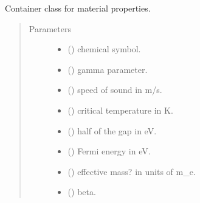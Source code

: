 \documentclass[letterpaper,10pt,english]{sphinxmanual}
\begin{document}
\begin{fulllineitems}
\label{\detokenize{code_structure:scdc.material.Material}}
Container class for material properties.
\begin{quote}\begin{description}
\item[{Parameters}] \leavevmode\begin{itemize}
\item {} 
 () \textendash{} chemical symbol.

\item {} 
 () \textendash{} gamma parameter.

\item {} 
 () \textendash{} speed of sound in m/s.

\item {} 
 () \textendash{} critical temperature in K.

\item {} 
 () \textendash{} half of the gap in eV.

\item {} 
 () \textendash{} Fermi energy in eV.

\item {} 
 () \textendash{} effective mass? in units of m\_e.

\item {} 
 () \textendash{} beta.

\end{itemize}

\end{description}\end{quote}


\end{fulllineitems}
\end{document}
